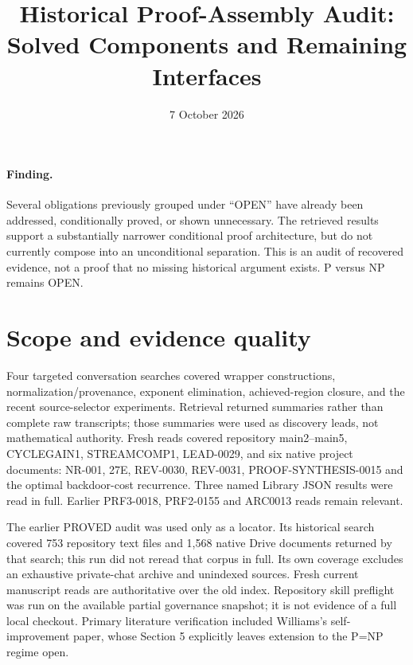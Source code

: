 \documentclass[11pt]{article}
\title{Historical Proof-Assembly Audit: Solved Components and Remaining Interfaces}
\date{7 October 2026}
\begin{document}
\maketitle
\paragraph{Finding.} Several obligations previously grouped under ``OPEN'' have already been addressed, conditionally proved, or shown unnecessary. The retrieved results support a substantially narrower conditional proof architecture, but do not currently compose into an unconditional separation. This is an audit of recovered evidence, not a proof that no missing historical argument exists. P versus NP remains OPEN.

\section{Scope and evidence quality}
Four targeted conversation searches covered wrapper constructions, normalization/provenance, exponent elimination, achieved-region closure, and the recent source-selector experiments. Retrieval returned summaries rather than complete raw transcripts; those summaries were used as discovery leads, not mathematical authority. Fresh reads covered repository main2--main5, CYCLEGAIN1, STREAMCOMP1, LEAD-0029, and six native project documents: NR-001, 27E, REV-0030, REV-0031, PROOF-SYNTHESIS-0015 and the optimal backdoor-cost recurrence. Three named Library JSON results were read in full. Earlier PRF3-0018, PRF2-0155 and ARC0013 reads remain relevant.

The earlier PROVED audit was used only as a locator. Its historical search covered 753 repository text files and 1,568 native Drive documents returned by that search; this run did not reread that corpus in full. Its own coverage excludes an exhaustive private-chat archive and unindexed sources. Fresh current manuscript reads are authoritative over the old index. Repository skill preflight was run on the available partial governance snapshot; it is not evidence of a full local checkout. Primary literature verification included Williams's self-improvement paper, whose Section 5 explicitly leaves extension to the P=NP regime open.
\end{document}
